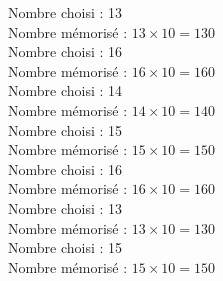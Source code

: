 \documentclass[a4paper,11pt,fleqn]{article}
\begin{document}
\bigskip
Nombre choisi : 13 \\
Nombre mémorisé : $13\times10=130$ \\

\bigskip
Nombre choisi : 16 \\
Nombre mémorisé : $16\times10=160$ \\

\bigskip
Nombre choisi : 14 \\
Nombre mémorisé : $14\times10=140$ \\

\bigskip
Nombre choisi : 15 \\
Nombre mémorisé : $15\times10=150$ \\

\bigskip
Nombre choisi : 16 \\
Nombre mémorisé : $16\times10=160$ \\

\bigskip
Nombre choisi : 13 \\
Nombre mémorisé : $13\times10=130$ \\

\bigskip
Nombre choisi : 15 \\
Nombre mémorisé : $15\times10=150$ \\

\bigskip
\end{document}
